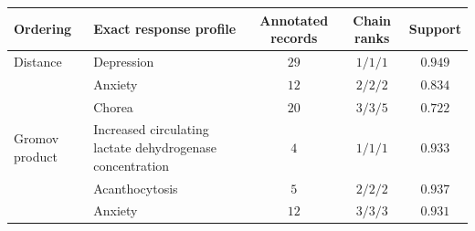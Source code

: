 \begin{tabular}{p{} p{} c c c}
\toprule
Ordering & Exact response profile & Annotated records & Chain ranks & Support \\
\midrule
Distance & Depression & $29$ & $1/1/1$ & $0.949$ \\
 & Anxiety & $12$ & $2/2/2$ & $0.834$ \\
 & Chorea & $20$ & $3/3/5$ & $0.722$ \\
\addlinespace
Gromov product & Increased circulating lactate dehydrogenase concentration & $4$ & $1/1/1$ & $0.933$ \\
 & Acanthocytosis & $5$ & $2/2/2$ & $0.937$ \\
 & Anxiety & $12$ & $3/3/3$ & $0.931$ \\
\bottomrule
\end{tabular}
